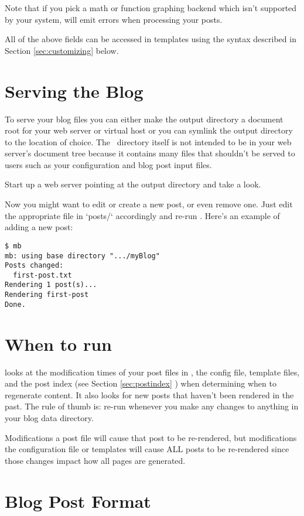 \documentclass[11pt, letterpaper, oneside, titlepage]{book}
\begin{document}
Note that if you pick a math or function graphing backend which isn't
supported by your system,  will emit errors when processing
your posts.

All of the above fields can be accessed in templates using the syntax
described in Section \ref{sec:customizing} below.

\section{Serving the Blog}

To serve your blog files you can either make the output directory a
document root for your web server or virtual host or you can symlink
the output directory to the location of choice.  The
\mathblog\ directory itself is not intended to be in your web server's
document tree because it contains many files that shouldn't be served
to users such as your configuration and blog post input files.

Start up a web server pointing at the output directory and take a
look.

Now you might want to edit or create a new post, or even remove one.
Just edit the appropriate file in `posts/` accordingly and re-run
.  Here's an example of adding a new post:

\begin{verbatim}
$ mb
mb: using base directory ".../myBlog"
Posts changed:
  first-post.txt
Rendering 1 post(s)...
Rendering first-post
Done.
\end{verbatim}

\section{When to run }

 looks at the modification times of your post files in
, the config file, template files, and the post index (see
Section \ref{sec:postindex} ) when determining when to regenerate
content.  It also looks for new posts that haven't been rendered in
the past.  The rule of thumb is: re-run  whenever you make any
changes to anything in your blog data directory.

Modifications a post file will cause that post to be re-rendered, but
modifications the configuration file or templates will cause ALL posts
to be re-rendered since those changes impact how all pages are
generated.

\section{Blog Post Format}
\end{document}
